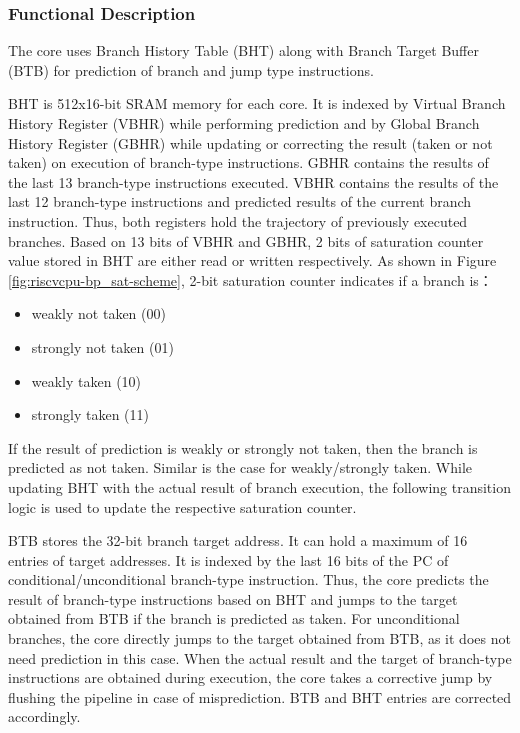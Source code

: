 \documentclass[main\_\_EN.tex]{subfiles}
\begin{document}
\subsubsection{Functional Description}
\label{sec:riscvcpu-perf-bp-func-descr}

The core uses Branch History Table (BHT) along with Branch Target Buffer (BTB) for prediction of branch and jump type instructions.

BHT is 512x16-bit SRAM memory for each core. It is indexed by Virtual Branch History Register (VBHR) while performing prediction and by Global Branch History Register (GBHR) while updating or correcting the result (taken or not taken) on execution of branch-type instructions. GBHR contains the results of the last 13 branch-type instructions executed. VBHR contains the results of the last 12 branch-type instructions and predicted results of the current branch instruction. Thus, both registers hold the trajectory of previously executed branches. Based on 13 bits of VBHR and GBHR, 2 bits of saturation counter value stored in BHT are either read or written respectively.
As shown in Figure \ref{fig:riscvcpu-bp_sat-scheme}, 2-bit saturation counter indicates if a branch is：
\begin{itemize}
    \item weakly not taken (00)
    \item strongly not taken (01)
    \item weakly taken (10)
    \item strongly taken (11)
\end{itemize}

If the result of prediction is weakly or strongly not taken, then the branch is predicted as not taken. Similar is the case for weakly/strongly taken. While updating BHT with the actual result of branch execution, the following transition logic is used to update the respective saturation counter.

BTB stores the 32-bit branch target address. It can hold a maximum of 16 entries of target addresses. It is indexed by the last 16 bits of the PC of conditional/unconditional branch-type instruction. Thus, the core predicts the result of branch-type instructions based on BHT and jumps to the target obtained from BTB if the branch is predicted as taken. For unconditional branches, the core directly jumps to the target obtained from BTB, as it does not need prediction in this case. When the actual result and the target of branch-type instructions are obtained during execution, the core takes a corrective jump by flushing the pipeline in case of misprediction. BTB and BHT entries are corrected accordingly.
\end{document}
